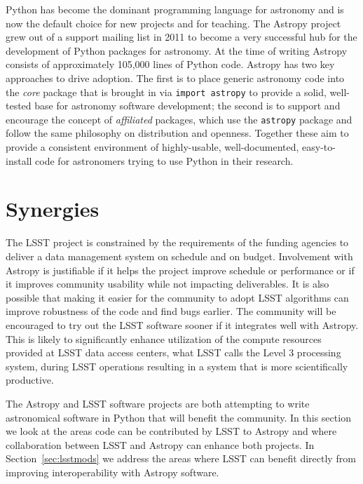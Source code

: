 \documentclass[]{spie}  %
\begin{document}
Python has become the dominant programming language for astronomy\cite{2000ASPC..216...59G,2006ASPC..351..343H,2006ASPC..351..497K,2011ASPC..442..425G,2012SPIE.8451E..02J} and is now the default choice for new projects and for teaching.
The Astropy\cite{2013A&A...558A..33A} project grew out of a support mailing list in 2011 to become a very successful hub for the development of Python packages for astronomy.
At the time of writing Astropy consists of approximately 105,000 lines of Python code.
Astropy has two key approaches to drive adoption.
The first is to place generic astronomy code into the \emph{core} package that is brought in via \texttt{import astropy} to provide a solid, well-tested base for astronomy software development; the second is to support and encourage the concept of \emph{affiliated} packages, which use the \texttt{astropy} package and follow the same philosophy on distribution and openness.
Together these aim to provide a consistent environment of highly-usable, well-documented, easy-to-install code for astronomers trying to use Python in their research.

\section{Synergies}

The LSST project is constrained by the requirements of the funding agencies to deliver a data management system on schedule and on budget.
Involvement with Astropy is justifiable if it helps the project improve schedule or performance or if it improves community usability while not impacting deliverables.
It is also possible that making it easier for the community to adopt LSST algorithms can improve robustness of the code and find bugs earlier.
The community will be encouraged to try out the LSST software sooner if it integrates well with Astropy.
This is likely to significantly enhance utilization of the compute resources provided at LSST data access centers, what LSST calls the Level 3 processing system, during LSST operations resulting in a system that is more scientifically productive.

The Astropy and LSST software projects are both attempting to write astronomical software in Python that will benefit the community.
In this section we look at the areas code can be contributed by LSST to Astropy and where collaboration between LSST and Astropy can enhance both projects.
In Section~\ref{sec:lsstmods} we address the areas where LSST can benefit directly from improving interoperability with Astropy software.
\end{document}
